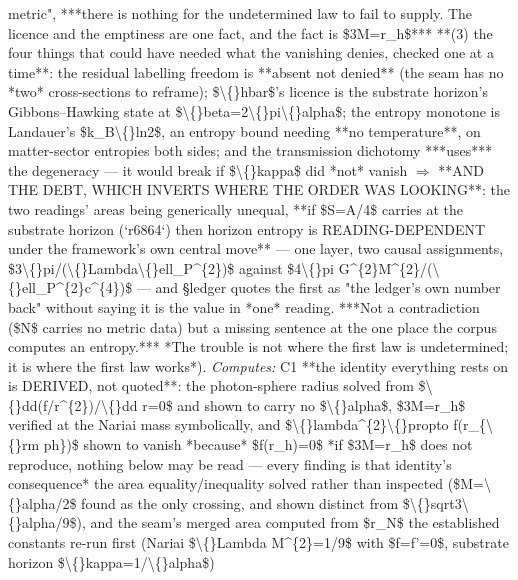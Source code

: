 \begin{description}
metric", ***there is nothing for the undetermined law to fail to supply. The licence and the emptiness are one fact, and the fact is \$3M=r\_h\$***  **(3) the four things that could have needed what the vanishing denies, checked one at a time**: the residual labelling freedom is **absent not denied** (the seam has no *two* cross-sections to reframe); \$\textbackslash\{\}hbar\$'s licence is the substrate horizon's Gibbons--Hawking state at \$\textbackslash\{\}beta=2\textbackslash\{\}pi\textbackslash\{\}alpha\$; the entropy monotone is Landauer's \$k\_B\textbackslash\{\}ln2\$, an entropy bound needing **no temperature**, on matter-sector entropies both sides; and the transmission dichotomy ***uses*** the degeneracy --- it would break if \$\textbackslash\{\}kappa\$ did *not* vanish \ensuremath{\Rightarrow}  **AND THE DEBT, WHICH INVERTS WHERE THE ORDER WAS LOOKING**: the two readings' areas being generically unequal, **if \$S=A/4\$ carries at the substrate horizon (`r6864`) then horizon entropy is READING-DEPENDENT under the framework's own central move** --- one layer, two causal assignments, \$3\textbackslash\{\}pi/(\textbackslash\{\}Lambda\textbackslash\{\}ell\_P\textasciicircum{}\{2\})\$ against \$4\textbackslash\{\}pi G\textasciicircum{}\{2\}M\textasciicircum{}\{2\}/(\textbackslash\{\}ell\_P\textasciicircum{}\{2\}c\textasciicircum{}\{4\})\$ --- and \S{}ledger quotes the first as "the ledger's own number back" without saying it is the value in *one* reading. ***Not a contradiction (\$N\$ carries no metric data) but a missing sentence at the one place the corpus computes an entropy.*** *The trouble is not where the first law is undetermined; it is where the first law works*). 
\emph{Computes:} C1 **the identity everything rests on is DERIVED, not quoted**: the photon-sphere radius solved from \$\textbackslash\{\}dd(f/r\textasciicircum{}\{2\})/\textbackslash\{\}dd r=0\$ and shown to carry no \$\textbackslash\{\}alpha\$, \$3M=r\_h\$ verified at the Nariai mass symbolically, and \$\textbackslash\{\}lambda\textasciicircum{}\{2\}\textbackslash\{\}propto f(r\_\{\textbackslash\{\}rm ph\})\$ shown to vanish *because* \$f(r\_h)=0\$  *if \$3M=r\_h\$ does not reproduce, nothing below may be read --- every finding is that identity's consequence*  the area equality/inequality solved rather than inspected (\$M=\textbackslash\{\}alpha/2\$ found as the only crossing, and shown distinct from \$\textbackslash\{\}sqrt3\textbackslash\{\}alpha/9\$), and the seam's merged area computed from \$r\_N\$  the established constants re-run first (Nariai \$\textbackslash\{\}Lambda M\textasciicircum{}\{2\}=1/9\$ with \$f=f'=0\$, substrate horizon \$\textbackslash\{\}kappa=1/\textbackslash\{\}alpha\$)

\end{description}
